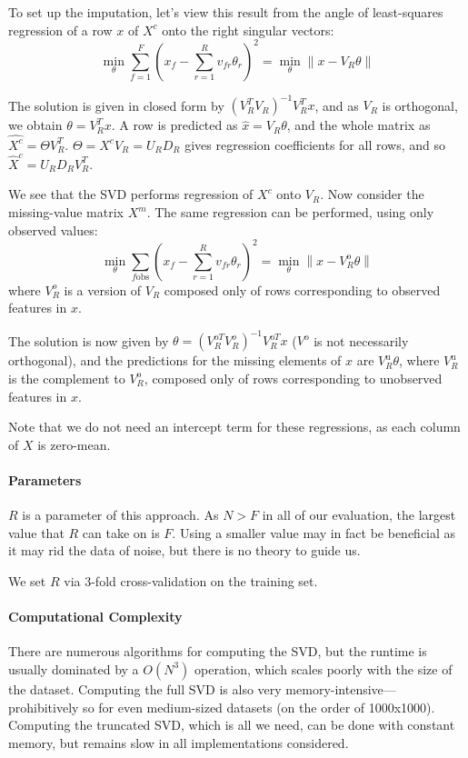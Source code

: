 To set up the imputation, let's view this result from the angle of least-squares regression of a row $x$ of $X^c$ onto the right singular vectors:
\begin{equation} \label{eq:svd_regression}
\min_\theta \sum_{f=1}^F (x_f - \sum_{r=1}^R v_{fr} \theta_r )^2 = \min_\theta \left\| x - V_R \theta \right\|
\end{equation}

The solution is given in closed form by $\left( V_R^T V_R \right)^{-1} V_R^T x$, and as $V_R$ is orthogonal, we obtain $\theta = V_R^T x$.
A row is predicted as $\hat{x} = V_R \theta$, and the whole matrix as $\hat{X^c} = \Theta V_R^T$.
$\Theta = X^c V_R = U_R D_R$ gives regression coefficients for all rows, and so $\hat{X}^c = U_R D_R V_R^T$.

We see that the SVD performs regression of $X^c$ onto $V_R$.
Now consider the missing-value matrix $X^m$.
The same regression can be performed, using only observed values:
\begin{equation}
\min_\theta \sum_{f \text{obs}} (x_f - \sum_{r=1}^R v_{fr} \theta_r )^2 = \min_\theta \left\| x - V_R^\text{o} \theta \right\|
\end{equation}
where $V_R^o$ is a version of $V_R$ composed only of rows corresponding to observed features in $x$.

The solution is now given by $\theta = \left( V_R^{\text{o}T} V_R^o \right)^{-1} V_R^{\text{o}T} x$ ($V^\text{o}$ is not necessarily orthogonal), and the predictions for the missing elements of $x$ are $V_R^\text{u} \theta$, where $V_R^\text{u}$ is the complement to $V_R^\text{o}$, composed only of rows corresponding to unobserved features in $x$.

Note that we do not need an intercept term for these regressions, as each column of $X$ is zero-mean.

\paragraph{Parameters}
$R$ is a parameter of this approach.
As $N > F$ in all of our evaluation, the largest value that $R$ can take on is $F$.
Using a smaller value may in fact be beneficial as it may rid the data of noise, but there is no theory to guide us.

We set $R$ via 3-fold cross-validation on the training set.

\paragraph{Computational Complexity}
There are numerous algorithms for computing the SVD, but the runtime is usually dominated by a $O(N^3)$ operation, which scales poorly with the size of the dataset.
Computing the full SVD is also very memory-intensive---prohibitively so for even medium-sized datasets (on the order of 1000x1000).
Computing the truncated SVD, which is all we need, can be done with constant memory, but remains slow in all implementations considered.

